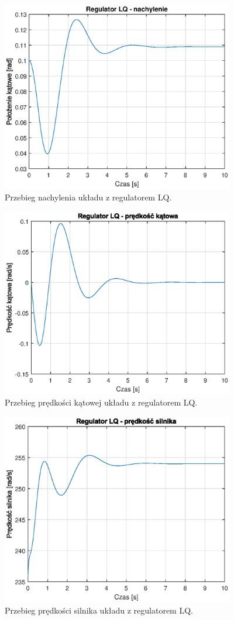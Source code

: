 \documentclass[11pt,a4paper]{article}
\begin{document}
\begin{figure}[H]
	\centering
	\includegraphics[width=4in]{Figures/LQ_model_obs_03_alpha_v.eps}
	\caption{Przebieg nachylenia układu z regulatorem LQ.}
	\label{fig:LQ_model_obs_03_alpha_v}
\end{figure}

\begin{figure}[H]
	\centering
	\includegraphics[width=4in]{Figures/LQ_model_obs_03_dalpha_v.eps}
	\caption{Przebieg prędkości kątowej układu z regulatorem LQ.}
	\label{fig:LQ_model_obs_03_dalpha_v}
\end{figure}

\begin{figure}[H]
	\centering
	\includegraphics[width=4in]{Figures/LQ_model_obs_03_w_v.eps}
	\caption{Przebieg prędkości silnika układu z regulatorem LQ.}
	\label{fig:LQ_model_obs_03_w_v}
\end{figure}
\end{document}
